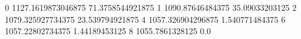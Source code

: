 0 1127.1619873046875 71.3758544921875
1 1090.87646484375 35.09033203125
2 1079.325927734375 23.539794921875
4 1057.326904296875 1.540771484375
6 1057.22802734375 1.44189453125
8 1055.7861328125 0.0
